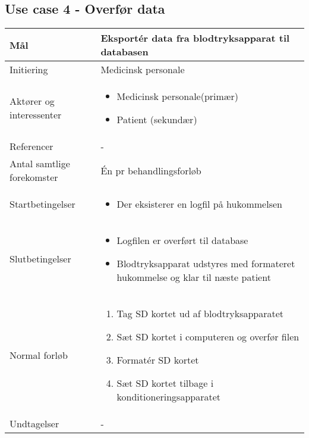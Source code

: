 	\subsection{Use case 4 - Overfør data}
		\begin{center}
			\begin{tabular}{ | p{} | p{}| } 
				\hline
				Mål & Eksportér data fra blodtryksapparat til databasen\\ 
				\hline
				Initiering &  Medicinsk personale\\
				\hline
				Aktører og interessenter & 
				\begin{itemize}
					\item Medicinsk personale(primær)
					\item Patient (sekundær)
				\end{itemize} \\ 
				\hline
				Referencer & - \\ 
				\hline
				Antal samtlige forekomster & Én pr behandlingsforløb \\ 
				\hline	
				Startbetingelser & 
				\begin{itemize}
					\item Der eksisterer en logfil på hukommelsen
				\end{itemize} \\ 
				\hline
				Slutbetingelser & 
				\begin{itemize}
					\item Logfilen er overført til database
					\item Blodtryksapparat udstyres med formateret hukommelse og klar til næste patient
				\end{itemize} \\ 
				\hline
				Normal forløb & \begin{enumerate}
					\setlength\itemsep{0cm} %
					\item Tag SD kortet ud af blodtryksapparatet 
					\item Sæt SD kortet i computeren og overfør filen 
					\item Formatér SD kortet
					\item Sæt SD kortet tilbage i konditioneringsapparatet 
				\end{enumerate} \\ 
				\hline
				Undtagelser & -\\ 
				\hline
			\end{tabular}
		\end{center}
			\pagebreak